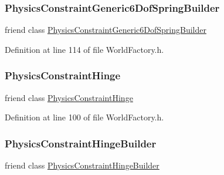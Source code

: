 \subsubsection{\texorpdfstring{Physics\+Constraint\+Generic6\+Dof\+Spring\+Builder}{PhysicsConstraintGeneric6DofSpringBuilder}}
{\footnotesize\ttfamily friend class \mbox{\hyperlink{classnjli_1_1_physics_constraint_generic6_dof_spring_builder}{Physics\+Constraint\+Generic6\+Dof\+Spring\+Builder}}\hspace{0.3cm}{\ttfamily [friend]}}



Definition at line 114 of file World\+Factory.\+h.

\mbox{\label{classnjli_1_1_world_factory_a0117dac2d3ca1ac4ebe089ac8c258560}} 
\subsubsection{\texorpdfstring{Physics\+Constraint\+Hinge}{PhysicsConstraintHinge}}
{\footnotesize\ttfamily friend class \mbox{\hyperlink{classnjli_1_1_physics_constraint_hinge}{Physics\+Constraint\+Hinge}}\hspace{0.3cm}{\ttfamily [friend]}}



Definition at line 100 of file World\+Factory.\+h.

\mbox{\label{classnjli_1_1_world_factory_aaf6a85f39db8c1e31e6aa37c65e1a674}} 
\subsubsection{\texorpdfstring{Physics\+Constraint\+Hinge\+Builder}{PhysicsConstraintHingeBuilder}}
{\footnotesize\ttfamily friend class \mbox{\hyperlink{classnjli_1_1_physics_constraint_hinge_builder}{Physics\+Constraint\+Hinge\+Builder}}\hspace{0.3cm}{\ttfamily [friend]}}



